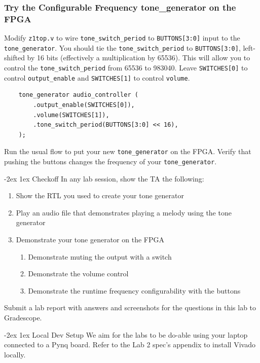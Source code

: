 \documentclass[11pt]{article}
\makeatletter
\renewcommand{\section}
{\@startsection {section}{1}{0pt}
 {-2ex}
 {1ex}
 {\bfseries\Large}}
\makeatother
\begin{document}
\subsubsection{Try the Configurable Frequency tone\_generator on the FPGA}
Modify \verb|z1top.v| to wire \verb|tone_switch_period| to \verb|BUTTONS[3:0]|
input to the \verb|tone_generator|. You should tie the \verb|tone_switch_period| to \verb|BUTTONS[3:0]|, left-shifted by 16 bits (effectively a multiplication by 65536).
This will allow you to control the \verb|tone_switch_period| from 65536 to 983040.
Leave \verb|SWITCHES[0]| to control \verb|output_enable| and \verb|SWITCHES[1]| to control \verb|volume|.

\begin{verbatim}
    tone_generator audio_controller (
        .output_enable(SWITCHES[0]),
        .volume(SWITCHES[1]),
        .tone_switch_period(BUTTONS[3:0] << 16),
    );
\end{verbatim}

Run the usual flow to put your new \verb|tone_generator| on the FPGA.
Verify that pushing the buttons changes the frequency of your \verb|tone_generator|.

\section{Checkoff}
In any lab session, show the TA the following:
\begin{enumerate}
  \item Show the RTL you used to create your tone generator
  \item Play an audio file that demonstrates playing a melody using the tone generator
  \item Demonstrate your tone generator on the FPGA
    \begin{enumerate}
      \item Demonstrate muting the output with a switch
      \item Demonstrate the volume control
      \item Demonstrate the runtime frequency configurability with the buttons
    \end{enumerate}
\end{enumerate}

Submit a lab report with answers and screenshots for the questions in this lab to Gradescope.

\appendix
\section{Local Dev Setup}
We aim for the labs to be do-able using your laptop connected to a Pynq board.
Refer to the Lab 2 spec's appendix to install Vivado locally.
\end{document}
